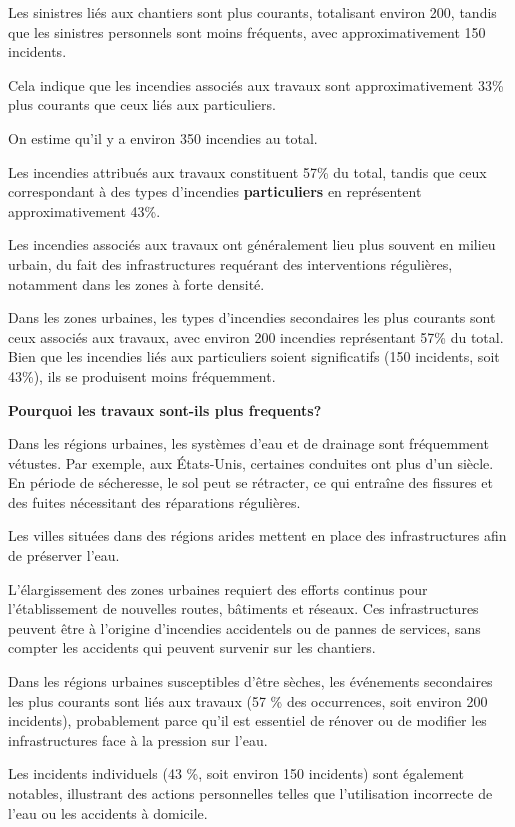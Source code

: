 \documentclass[
]{article}
\begin{document}
Les sinistres liés aux chantiers sont plus courants, totalisant environ
200, tandis que les sinistres personnels sont moins fréquents, avec
approximativement 150 incidents.

Cela indique que les incendies associés aux travaux sont
approximativement 33\% plus courants que ceux liés aux particuliers.

On estime qu'il y a environ 350 incendies au total.

Les incendies attribués aux travaux constituent 57\% du total, tandis
que ceux correspondant à des types d'incendies \textbf{particuliers} en
représentent approximativement 43\%.

Les incendies associés aux travaux ont généralement lieu plus souvent en
milieu urbain, du fait des infrastructures requérant des interventions
régulières, notamment dans les zones à forte densité.

Dans les zones urbaines, les types d'incendies secondaires les plus
courants sont ceux associés aux travaux, avec environ 200 incendies
représentant 57\% du total. Bien que les incendies liés aux particuliers
soient significatifs (150 incidents, soit 43\%), ils se produisent moins
fréquemment.

\textbf{Pourquoi les travaux sont-ils plus frequents?}

Dans les régions urbaines, les systèmes d'eau et de drainage sont
fréquemment vétustes. Par exemple, aux États-Unis, certaines conduites
ont plus d'un siècle. En période de sécheresse, le sol peut se
rétracter, ce qui entraîne des fissures et des fuites nécessitant des
réparations régulières.

Les villes situées dans des régions arides mettent en place des
infrastructures afin de préserver l'eau.

L'élargissement des zones urbaines requiert des efforts continus pour
l'établissement de nouvelles routes, bâtiments et réseaux. Ces
infrastructures peuvent être à l'origine d'incendies accidentels ou de
pannes de services, sans compter les accidents qui peuvent survenir sur
les chantiers.

Dans les régions urbaines susceptibles d'être sèches, les événements
secondaires les plus courants sont liés aux travaux (57 \% des
occurrences, soit environ 200 incidents), probablement parce qu'il est
essentiel de rénover ou de modifier les infrastructures face à la
pression sur l'eau.

Les incidents individuels (43 \%, soit environ 150 incidents) sont
également notables, illustrant des actions personnelles telles que
l'utilisation incorrecte de l'eau ou les accidents à domicile.
\end{document}
